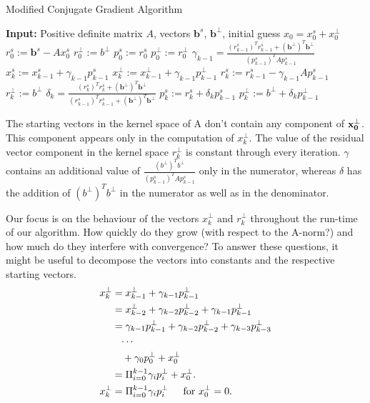 \begin{algorithm}
\caption{Modified Conjugate Gradient Algorithm}
\label{alg:modified_cg}
\begin{algorithmic}[1]
  \STATE \textbf{Input:} Positive definite matrix $A$, vectors $\boldsymbol{b}^s$, $\boldsymbol{b}^\perp$, initial guess $x_0 = x_0^s + x_0^\perp$
  \STATE $r_0^s := \boldsymbol{b}^s - A x_0^s$
  \hfill $r_0^{\perp} := b^{\perp}$
  \STATE $p_0^s := r_0^s$
  \hfill $p_0^{\perp} := r_0^{\perp}$
    \STATE $\gamma_{k-1} = \frac{(r_{k-1}^s)^T r_{k-1}^s + (\boldsymbol{b}^\perp)^T \boldsymbol{b}^\perp}{(p_{k-1}^s)^T A p_{k-1}^s}$
    \STATE $x_k^s := x_{k-1}^s + \gamma_{k-1} p_{k-1}^s$ \hfill $x_k^{\perp} := x_{k-1}^{\perp} + \gamma_{k-1} p_{k-1}^{\perp}$
    \STATE $r_k^s := r_{k-1}^s - \gamma_{k-1} A p_{k-1}^s$
    \hfill $r_k^{\perp} := b^{\perp}$
    \STATE $\delta_k = \frac{(r_k^s)^T r_k^s + (\boldsymbol{b}^\perp)^T \boldsymbol{b}^\perp}{(r_{k-1}^s)^T r_{k-1}^s + (\boldsymbol{b}^\perp)^T \boldsymbol{b}^\perp}$
    \STATE $p_k^s := r_k^s + \delta_k p_{k-1}^s$
    \hfill $p_k^{\perp} := b^{\perp} + \delta_k p_{k-1}^{\perp}$
  \ENDFOR
\end{algorithmic}
\end{algorithm}


The starting vectors in the kernel space of A don't contain any component of \(\bold{x_0^\perp}\). This component appears only in the computation of \(x_k^\perp\).
The value of the residual vector component in the kernel space \(r_k^\perp\) is constant through every iteration. \(\gamma\) contains an additional value of \(\frac{ (b^{\perp})^T b^{\perp}}{(p_{k-1}^s)^T A p_{k-1}^s}\) only in the numerator, whereas \(\delta\) has the addition of \((b^\perp)^Tb^\perp\) in the numerator as well as in the denominator.

Our focus is on the behaviour of the vectors \(x_k^\perp \text{ and } r_k^\perp\) throughout the run-time of our algorithm. How quickly do they grow (with respect to the A-norm?) and how much do they interfere with convergence?
To answer these questions, it might be useful to decompose the vectors into constants and the respective starting vectors.
\begin{equation}
\begin{aligned}
x_k^\perp &= x_{k-1}^\perp + \gamma_{k-1}p_{k-1}^\perp \\
&= x_{k-2}^\perp + \gamma_{k-2}p_{k-2}^\perp  + \gamma_{k-1}p_{k-1}^\perp\\
&= \gamma_{k-1}p_{k-1}^\perp + \gamma_{k-2}p_{k-2}^\perp  + \gamma_{k-3}p_{k-3}^\perp   \\
&\hphantom{=} \cdots  \\ 
&\quad + \gamma_{0}p_{0}^\perp + x_0^\perp  \\
&=\Pi_{i=0}^{k-1}\gamma_{i}p_{i}^\perp + x_0^\perp. \\
x_k^\perp &= \Pi_{i=0}^{k-1}\gamma_{i}p_{i}^\perp \indent\text{for \(x_0^\perp = 0\).}
\label{x_k decomp}
\end{aligned}
\end{equation}


